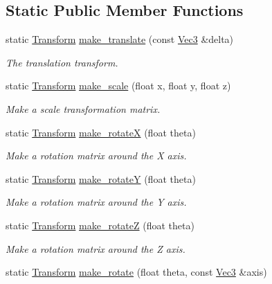 \subsection*{Static Public Member Functions}
\begin{DoxyCompactItemize}
\item 
static \mbox{\hyperlink{classomg_1_1_transform}{Transform}} \mbox{\hyperlink{classomg_1_1_transform_a5aa09545d3fae8f71e36a22cafe67285}{make\+\_\+translate}} (const \mbox{\hyperlink{namespaceomg_a45a9482677fee9933ff369b49894e316}{Vec3}} \&delta)
\begin{DoxyCompactList}\small\item\em The translation transform. \end{DoxyCompactList}\item 
static \mbox{\hyperlink{classomg_1_1_transform}{Transform}} \mbox{\hyperlink{classomg_1_1_transform_a2b019384f6c6406b926435d29e0a9d40}{make\+\_\+scale}} (float x, float y, float z)
\begin{DoxyCompactList}\small\item\em Make a scale transformation matrix. \end{DoxyCompactList}\item 
static \mbox{\hyperlink{classomg_1_1_transform}{Transform}} \mbox{\hyperlink{classomg_1_1_transform_a95df27f1a663e5b43c678a3528d9096c}{make\+\_\+rotateX}} (float theta)
\begin{DoxyCompactList}\small\item\em Make a rotation matrix around the X axis. \end{DoxyCompactList}\item 
static \mbox{\hyperlink{classomg_1_1_transform}{Transform}} \mbox{\hyperlink{classomg_1_1_transform_a31915f4d8125beac27eb97f811583e8b}{make\+\_\+rotateY}} (float theta)
\begin{DoxyCompactList}\small\item\em Make a rotation matrix around the Y axis. \end{DoxyCompactList}\item 
static \mbox{\hyperlink{classomg_1_1_transform}{Transform}} \mbox{\hyperlink{classomg_1_1_transform_aca812cd5996e0e0711be1845c060797b}{make\+\_\+rotateZ}} (float theta)
\begin{DoxyCompactList}\small\item\em Make a rotation matrix around the Z axis. \end{DoxyCompactList}\item 
static \mbox{\hyperlink{classomg_1_1_transform}{Transform}} \mbox{\hyperlink{classomg_1_1_transform_a749e019617a935bc3666f7dc3b0ac529}{make\+\_\+rotate}} (float theta, const \mbox{\hyperlink{namespaceomg_a45a9482677fee9933ff369b49894e316}{Vec3}} \&axis)

\end{DoxyCompactItemize}
